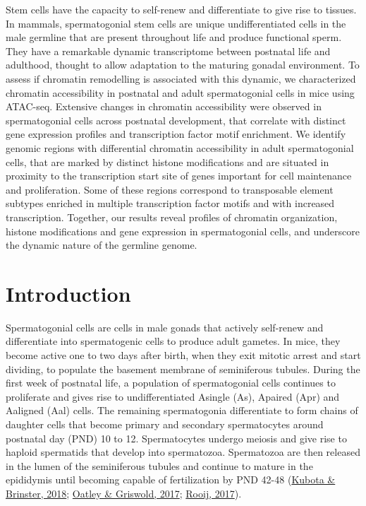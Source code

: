 \documentclass[12pt,twoside]{reedthesis}
\begin{document}
Stem cells have the capacity to self-renew and differentiate to give
rise to tissues. In mammals, spermatogonial stem cells are unique
undifferentiated cells in the male germline that are present throughout
life and produce functional sperm. They have a remarkable dynamic
transcriptome between postnatal life and adulthood, thought to allow
adaptation to the maturing gonadal environment. To assess if chromatin
remodelling is associated with this dynamic, we characterized chromatin
accessibility in postnatal and adult spermatogonial cells in mice using
ATAC-seq. Extensive changes in chromatin accessibility were observed in
spermatogonial cells across postnatal development, that correlate with
distinct gene expression profiles and transcription factor motif
enrichment. We identify genomic regions with differential chromatin
accessibility in adult spermatogonial cells, that are marked by distinct
histone modifications and are situated in proximity to the transcription
start site of genes important for cell maintenance and proliferation.
Some of these regions correspond to transposable element subtypes
enriched in multiple transcription factor motifs and with increased
transcription. Together, our results reveal profiles of chromatin
organization, histone modifications and gene expression in
spermatogonial cells, and underscore the dynamic nature of the germline
genome.

\newpage

\hypertarget{introduction}{%
\section{Introduction}\label{introduction}}

Spermatogonial cells are cells in male gonads that actively self-renew
and differentiate into spermatogenic cells to produce adult gametes. In
mice, they become active one to two days after birth, when they exit
mitotic arrest and start dividing, to populate the basement membrane of
seminiferous tubules. During the first week of postnatal life, a
population of spermatogonial cells continues to proliferate and gives
rise to undifferentiated Asingle (As), Apaired (Apr) and Aaligned (Aal)
cells. The remaining spermatogonia differentiate to form chains of
daughter cells that become primary and secondary spermatocytes around
postnatal day (PND) 10 to 12. Spermatocytes undergo meiosis and give
rise to haploid spermatids that develop into spermatozoa. Spermatozoa
are then released in the lumen of the seminiferous tubules and continue
to mature in the epididymis until becoming capable of fertilization by
PND 42-48 (\protect\hyperlink{ref-kubota2018}{Kubota \& Brinster, 2018}; \protect\hyperlink{ref-thebiol2017}{Oatley \& Griswold, 2017}; \protect\hyperlink{ref-rooij2017}{Rooij, 2017}).
\end{document}
